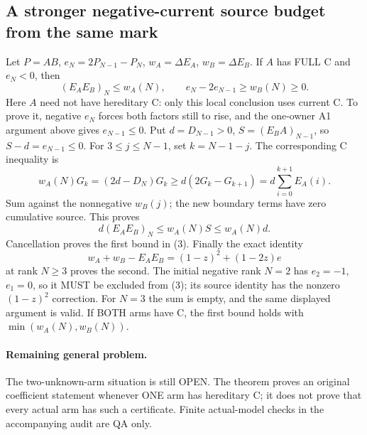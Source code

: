 \subsection{A stronger negative-current source budget from the same mark}
Let $P=AB$, $e_N=2P_{N-1}-P_N$, $w_A=\Delta E_A$, $w_B=\Delta E_B$.
If $A$ has FULL C and $e_N<0$, then
\[
 (E_AE_B)_N\le w_A(N),\qquad
 e_N-2e_{N-1}\ge w_B(N)\ge0.                            \tag{3}
\]
Here $A$ need not have hereditary C: only this local conclusion uses
current C. To prove it, negative $e_N$ forces both factors still to
rise, and the one-owner A1 argument above gives $e_{N-1}\le0$.
Put $d=D_{N-1}>0$, $S=(E_BA)_{N-1}$, so $S-d=e_{N-1}\le0$.
For $3\le j\le N-1$, set $k=N-1-j$. The corresponding C inequality is
\[
 w_A(N)G_k=(2d-D_N)G_k
                 \ge d(2G_k-G_{k+1})
                 =d\sum_{i=0}^{k+1}E_A(i).
\]
Sum against the nonnegative $w_B(j)$; the new boundary terms have
zero cumulative source. This proves
\[
 d(E_AE_B)_N\le w_A(N)S\le w_A(N)d.
\]
Cancellation proves the first bound in (3). Finally the exact identity
\[
 w_A+w_B-E_AE_B=(1-z)^2+(1-2z)e
\]
at rank $N\ge3$ proves the second. The initial negative rank $N=2$
has $e_2=-1$, $e_1=0$, so it MUST be excluded from (3); its source
identity has the nonzero $(1-z)^2$ correction. For $N=3$ the sum
is empty, and the same displayed argument is valid. If BOTH arms have
C, the first bound holds with $\min(w_A(N),w_B(N))$.

\paragraph{Remaining general problem.}
The two-unknown-arm situation is still OPEN. The theorem proves an
original coefficient statement whenever ONE arm has hereditary C;
it does not prove that every actual arm has such a certificate.
Finite actual-model checks in the accompanying audit are QA only.
